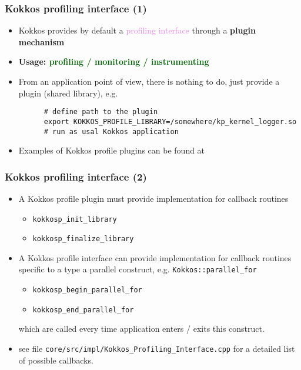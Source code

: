 \begin{frame}[fragile=singleslide]
  \frametitle{Kokkos profiling interface (1)}

  \begin{itemize}
  \item Kokkos provides by default a \textcolor{violet}{profiling interface} through a {\bf plugin mechanism}
  \item {\bf Usage: \textcolor{darkgreen}{profiling / monitoring / instrumenting}}
  \item From an application point of view, there is nothing to do, just provide a plugin (shared library), e.g.
    \begin{verbatim}
      # define path to the plugin
      export KOKKOS_PROFILE_LIBRARY=/somewhere/kp_kernel_logger.so
      # run as usal Kokkos application
    \end{verbatim}
  \item Examples of Kokkos profile plugins can be found at\\
  \end{itemize}

\end{frame}

\begin{frame}[fragile=singleslide]
  \frametitle{Kokkos profiling interface (2)}

  \begin{itemize}
  \item A Kokkos profile plugin must provide implementation for callback routines
    \begin{itemize}
    \item \texttt{kokkosp\_init\_library}
    \item \texttt{kokkosp\_finalize\_library}
    \end{itemize}
  \item A Kokkos profile interface can provide implementation for callback routines specific to a type a parallel construct, e.g. \texttt{Kokkos::parallel\_for}
    \begin{itemize}
    \item \texttt{kokkosp\_begin\_parallel\_for}
    \item \texttt{kokkosp\_end\_parallel\_for}
    \end{itemize}
    which are called every time application enters / exits this construct.
    \item see file \texttt{core/src/impl/Kokkos\_Profiling\_Interface.cpp} for a detailed list of possible callbacks.
  \end{itemize}
  
\end{frame}